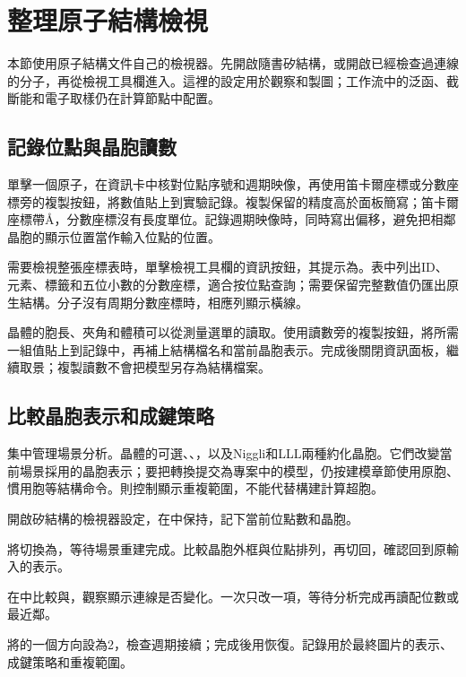 \section{整理原子結構檢視}

本節使用原子結構文件自己的檢視器。先開啟隨書矽結構，或開啟已經檢查過連線的分子，再從檢視工具欄進入。這裡的設定用於觀察和製圖；工作流中的泛函、截斷能和電子取樣仍在計算節點中配置。

\subsection{記錄位點與晶胞讀數}

單擊一個原子，在資訊卡中核對位點序號和週期映像，再使用笛卡爾座標或分數座標旁的複製按鈕，將數值貼上到實驗記錄。複製保留的精度高於面板簡寫；笛卡爾座標帶\AA，分數座標沒有長度單位。記錄週期映像時，同時寫出偏移，避免把相鄰晶胞的顯示位置當作輸入位點的位置。

需要檢視整張座標表時，單擊檢視工具欄的資訊按鈕，其提示為。表中列出ID、元素、標籤和五位小數的分數座標，適合按位點查詢；需要保留完整數值仍匯出原生結構。分子沒有周期分數座標時，相應列顯示橫線。

晶體的胞長、夾角和體積可以從測量選單的讀取。使用讀數旁的複製按鈕，將所需一組值貼上到記錄中，再補上結構檔名和當前晶胞表示。完成後關閉資訊面板，繼續取景；複製讀數不會把模型另存為結構檔案。

\subsection{比較晶胞表示和成鍵策略}

集中管理場景分析。晶體的可選、、，以及Niggli和LLL兩種約化晶胞。它們改變當前場景採用的晶胞表示；要把轉換提交為專案中的模型，仍按建模章節使用原胞、慣用胞等結構命令。則控制顯示重複範圍，不能代替構建計算超胞。

\begin{steps}
\item 開啟矽結構的檢視器設定，在中保持，記下當前位點數和晶胞。
\item 將切換為，等待場景重建完成。比較晶胞外框與位點排列，再切回，確認回到原輸入的表示。
\item 在中比較與，觀察顯示連線是否變化。一次只改一項，等待分析完成再讀配位數或最近鄰。
\item 將的一個方向設為2，檢查週期接續；完成後用恢復。記錄用於最終圖片的表示、成鍵策略和重複範圍。
\end{steps}

